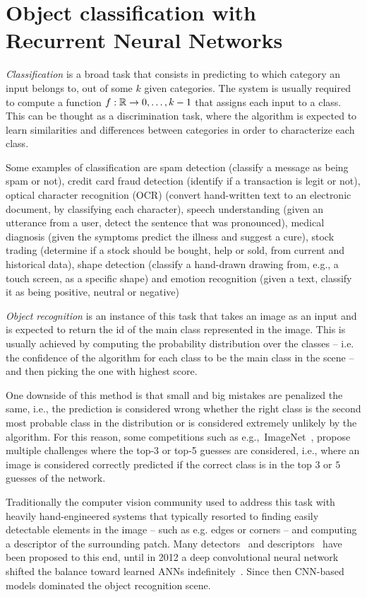 \chapter{Object classification with Recurrent Neural Networks}\label{sec:renet}

\emph{Classification} is a broad task that consists in predicting to which
category an input belongs to, out of some $k$ given categories. The system is
usually required to compute a function $f: \mathbb{R} \to {0, \dots, k-1}$ that
assigns each input to a class. This can be thought as a discrimination task,
where the algorithm is expected to learn similarities and differences between
categories in order to characterize each class.

Some examples of classification are spam detection (classify a message as being
spam or not), credit card fraud detection (identify if a transaction is legit
or not), optical character recognition (OCR) (convert hand-written text to an
electronic document, by classifying each character), speech understanding
(given an utterance from a user, detect the sentence that was pronounced),
medical diagnosis (given the symptoms predict the illness and suggest a cure),
stock trading (determine if a stock should be bought, help or sold, from
current and historical data), shape detection (classify a hand-drawn drawing
from, e.g., a touch screen, as a specific shape) and emotion recognition (given
a text, classify it as being positive, neutral or negative)

\emph{Object recognition} is an instance of this task that takes an image as an
input and is expected to return the id of the main class represented in the
image. This is usually achieved by computing the probability distribution over
the classes -- i.e. the confidence of the algorithm for each class to be the
main class in the scene -- and then picking the one with highest score.

One downside of this method is that small and big mistakes are penalized the
same, i.e., the prediction is considered wrong whether the right class is the
second most probable class in the distribution or is considered extremely
unlikely by the algorithm. For this reason, some competitions such as
e.g.,~ImageNet~\citep{imagenet_cvpr09, ILSVRCarxiv14}, propose multiple
challenges where the top-3 or top-5 guesses are considered, i.e., where an
image is considered correctly predicted if the correct class is in the top
$3$ or $5$ guesses of the network.

Traditionally the computer vision community used to address this task with
heavily hand-engineered systems that typically resorted to finding easily
detectable elements in the image -- such as e.g. edges or corners -- and
computing a descriptor of the surrounding patch. Many detectors~\cite{
dufournaud2000matching,harris1988combined,mikolajczyk2001indexing,
lowe2004distinctive,mikolajczyk2005performance} and descriptors~\cite{
lowe1999object,mikolajczyk2005performance,belongie2002shape} have been proposed
to this end, until in 2012 a deep convolutional neural network shifted the
balance toward learned ANNs indefinitely~\citep{Krizhevsky-2012}. Since then
CNN-based models dominated the object recognition scene.

